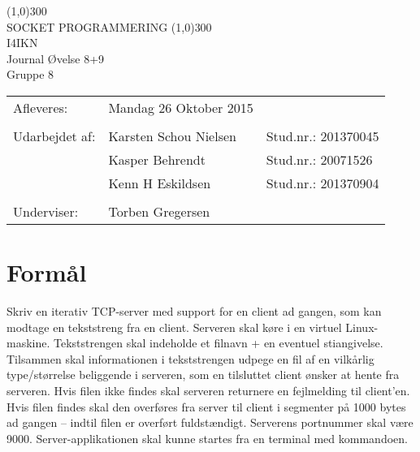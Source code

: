 \documentclass{article}
\begin{document}
\begin{titlepage}
\begin{center}
\line(1,0){300}\\
[0.25in]
\huge{SOCKET PROGRAMMERING} 											%
\line(1,0){300}\\
[1cm]
\huge{I4IKN\\ Journal Øvelse 8+9} \\
Gruppe 8\\ %
[3cm]

\large
\begin{tabular}{l l l}
Afleveres: 		& Mandag 26 Oktober 2015 & 						\\ 		%
																\\
Udarbejdet af:  & Karsten Schou Nielsen  & Stud.nr.: 201370045  \\
				& Kasper Behrendt		 & Stud.nr.: 20071526   \\
				& Kenn H Eskildsen 		 & Stud.nr.: 201370904  \\
																\\
Underviser:		& Torben Gregersen 								\\		%

\end{tabular}
\end{center}
\end{titlepage}

\newpage
\tableofcontents
\thispagestyle{empty}
\cleardoublepage
\setcounter{page}{1}
\newpage
\section{Formål}

Skriv en iterativ TCP-server med support for en client ad gangen, som kan modtage
en tekststreng fra en client. Serveren skal køre i en virtuel Linux-maskine.
Tekststrengen skal indeholde et filnavn + en eventuel stiangivelse. Tilsammen skal
informationen i tekststrengen udpege en fil af en vilkårlig type/størrelse beliggende i
serveren, som en tilsluttet client ønsker at hente fra serveren. Hvis filen ikke findes
skal serveren returnere en fejlmelding til client’en. Hvis filen findes skal den overføres
fra server til client i segmenter på 1000 bytes ad gangen – indtil filen er overført
fuldstændigt. Serverens portnummer skal være 9000. Server-applikationen skal
kunne startes fra en terminal med kommandoen.
\end{document}

